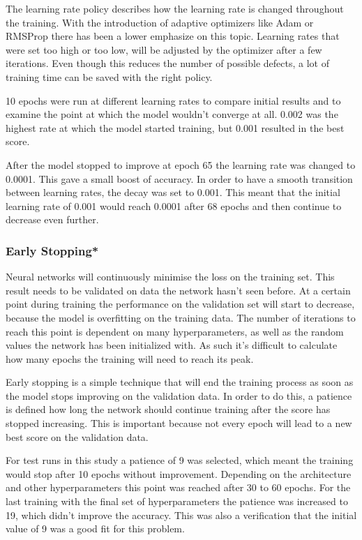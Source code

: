 The learning rate policy describes how the learning rate is changed throughout the training. With the introduction of adaptive optimizers like Adam or RMSProp there has been a lower emphasize on this topic. Learning rates that were set too high or too low, will be adjusted by the optimizer after a few iterations. Even though this reduces the number of possible defects, a lot of training time can be saved with the right policy.

10 epochs were run at different learning rates to compare initial results and to examine the point at which the model wouldn't converge at all. 0.002 was the highest rate at which the model started training, but 0.001 resulted in the best score.

After the model stopped to improve at epoch 65 the learning rate was changed to 0.0001. This gave a small boost of accuracy. In order to have a smooth transition between learning rates, the decay was set to 0.001. This meant that the initial learning rate of 0.001 would reach 0.0001 after 68 epochs and then continue to decrease even further.

\subsubsection{Early Stopping*}

Neural networks will continuously minimise the loss on the training set. This result needs to be validated on data the network hasn't seen before. At a certain point during training the performance on the validation set will start to decrease, because the model is overfitting on the training data. The number of iterations to reach this point is dependent on many hyperparameters, as well as the random values the network has been initialized with. As such it's difficult to calculate how many epochs the training will need to reach its peak.

Early stopping is a simple technique that will end the training process as soon as the model stops improving on the validation data. In order to do this, a patience is defined how long the network should continue training after the score has stopped increasing. This is important because not every epoch will lead to a new best score on the validation data.

For test runs in this study a patience of 9 was selected, which meant the training would stop after 10 epochs without improvement. Depending on the architecture and other hyperparameters this point was reached after 30 to 60 epochs. For the last training with the final set of hyperparameters the patience was increased to 19, which didn't improve the accuracy.  This was also a verification that the initial value of 9 was a good fit for this problem.



\newpage

